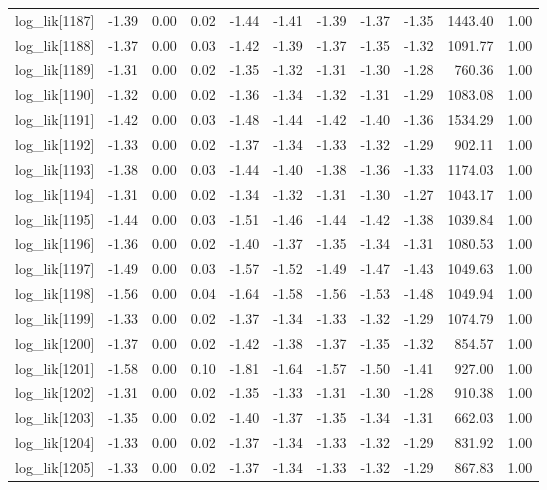 \begin{table}[ht]
\begin{tabular}{rrrrrrrrrrr}
  log\_lik[1187] & -1.39 & 0.00 & 0.02 & -1.44 & -1.41 & -1.39 & -1.37 & -1.35 & 1443.40 & 1.00 \\ 
  log\_lik[1188] & -1.37 & 0.00 & 0.03 & -1.42 & -1.39 & -1.37 & -1.35 & -1.32 & 1091.77 & 1.00 \\ 
  log\_lik[1189] & -1.31 & 0.00 & 0.02 & -1.35 & -1.32 & -1.31 & -1.30 & -1.28 & 760.36 & 1.00 \\ 
  log\_lik[1190] & -1.32 & 0.00 & 0.02 & -1.36 & -1.34 & -1.32 & -1.31 & -1.29 & 1083.08 & 1.00 \\ 
  log\_lik[1191] & -1.42 & 0.00 & 0.03 & -1.48 & -1.44 & -1.42 & -1.40 & -1.36 & 1534.29 & 1.00 \\ 
  log\_lik[1192] & -1.33 & 0.00 & 0.02 & -1.37 & -1.34 & -1.33 & -1.32 & -1.29 & 902.11 & 1.00 \\ 
  log\_lik[1193] & -1.38 & 0.00 & 0.03 & -1.44 & -1.40 & -1.38 & -1.36 & -1.33 & 1174.03 & 1.00 \\ 
  log\_lik[1194] & -1.31 & 0.00 & 0.02 & -1.34 & -1.32 & -1.31 & -1.30 & -1.27 & 1043.17 & 1.00 \\ 
  log\_lik[1195] & -1.44 & 0.00 & 0.03 & -1.51 & -1.46 & -1.44 & -1.42 & -1.38 & 1039.84 & 1.00 \\ 
  log\_lik[1196] & -1.36 & 0.00 & 0.02 & -1.40 & -1.37 & -1.35 & -1.34 & -1.31 & 1080.53 & 1.00 \\ 
  log\_lik[1197] & -1.49 & 0.00 & 0.03 & -1.57 & -1.52 & -1.49 & -1.47 & -1.43 & 1049.63 & 1.00 \\ 
  log\_lik[1198] & -1.56 & 0.00 & 0.04 & -1.64 & -1.58 & -1.56 & -1.53 & -1.48 & 1049.94 & 1.00 \\ 
  log\_lik[1199] & -1.33 & 0.00 & 0.02 & -1.37 & -1.34 & -1.33 & -1.32 & -1.29 & 1074.79 & 1.00 \\ 
  log\_lik[1200] & -1.37 & 0.00 & 0.02 & -1.42 & -1.38 & -1.37 & -1.35 & -1.32 & 854.57 & 1.00 \\ 
  log\_lik[1201] & -1.58 & 0.00 & 0.10 & -1.81 & -1.64 & -1.57 & -1.50 & -1.41 & 927.00 & 1.00 \\ 
  log\_lik[1202] & -1.31 & 0.00 & 0.02 & -1.35 & -1.33 & -1.31 & -1.30 & -1.28 & 910.38 & 1.00 \\ 
  log\_lik[1203] & -1.35 & 0.00 & 0.02 & -1.40 & -1.37 & -1.35 & -1.34 & -1.31 & 662.03 & 1.00 \\ 
  log\_lik[1204] & -1.33 & 0.00 & 0.02 & -1.37 & -1.34 & -1.33 & -1.32 & -1.29 & 831.92 & 1.00 \\ 
  log\_lik[1205] & -1.33 & 0.00 & 0.02 & -1.37 & -1.34 & -1.33 & -1.32 & -1.29 & 867.83 & 1.00 \\ 

\end{tabular}
\end{table}
